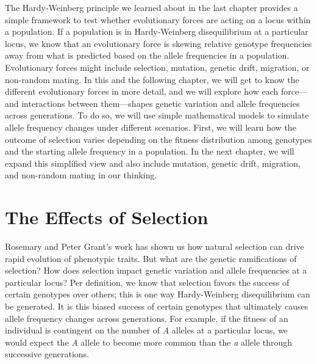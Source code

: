 \documentclass[
]{book}
\begin{document}
The Hardy-Weinberg principle we learned about in the last chapter provides a simple framework to test whether evolutionary forces are acting on a locus within a population. If a population is in Hardy-Weinberg disequilibrium at a particular locus, we know that an evolutionary force is skewing relative genotype frequencies away from what is predicted based on the allele frequencies in a population. Evolutionary forces might include selection, mutation, genetic drift, migration, or non-random mating. In this and the following chapter, we will get to know the different evolutionary forces in more detail, and we will explore how each force---and interactions between them---shapes genetic variation and allele frequencies across generations. To do so, we will use simple mathematical models to simulate allele frequency changes under different scenarios. First, we will learn how the outcome of selection varies depending on the fitness distribution among genotypes and the starting allele frequency in a population. In the next chapter, we will expand this simplified view and also include mutation, genetic drift, migration, and non-random mating in our thinking.

\hypertarget{the-effects-of-selection}{%
\section{The Effects of Selection}\label{the-effects-of-selection}}

Rosemary and Peter Grant's work has shown us how natural selection can drive rapid evolution of phenotypic traits. But what are the genetic ramifications of selection? How does selection impact genetic variation and allele frequencies at a particular locus? Per definition, we know that selection favors the success of certain genotypes over others; this is one way Hardy-Weinberg disequilibrium can be generated. It is this biased success of certain genotypes that ultimately causes allele frequency changes across generations. For example, if the fitness of an individual is contingent on the number of \emph{A} alleles at a particular locus, we would expect the \emph{A} allele to become more common than the \emph{a} allele through successive generations.
\end{document}
